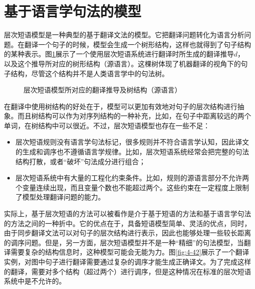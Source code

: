 \sectionnewpage
\section{基于语言学句法的模型}\label{section-4.4}

\parinterval 层次短语模型是一种典型的基于翻译文法的模型。它把翻译问题转化为语言分析问题。在翻译一个句子的时候，模型会生成一个树形结构，这样也就得到了句子结构的某种表示。图\ref{fig:4-41}展示了一个使用层次短语系统进行翻译时所生成的翻译推导$d$，以及这个推导所对应的树形结构（源语言）。这棵树体现了机器翻译的视角下的句子结构，尽管这个结构并不是人类语言学中的句法树。

\begin{figure}[htp]
\centering

\setlength{\belowcaptionskip}{-0.5em}
\caption{层次短语模型所对应的翻译推导及树结构（源语言）}
\label{fig:4-41}
\end{figure}

\parinterval 在翻译中使用树结构的好处在于，模型可以更加有效地对句子的层次结构进行抽象。而且树结构可以作为对序列结构的一种补充，比如，在句子中距离较远的两个单词，在树结构中可以很近。不过，层次短语模型也存在一些不足：

\begin{itemize}
\vspace{0.5em}
\item 层次短语规则没有语言学句法标记，很多规则并不符合语言学认知，因此译文的生成和调序也不遵循语言学规律。比如，层次短语系统经常会把完整的句法结构打散，或者``破坏''句法成分进行组合；
\vspace{0.5em}
\item 层次短语系统中有大量的工程化约束条件。比如，规则的源语言部分不允许两个变量连续出现，而且变量个数也不能超过两个。这些约束在一定程度上限制了模型处理翻译问题的能力。
\vspace{0.5em}
\end{itemize}

\parinterval 实际上，基于层次短语的方法可以被看作是介于基于短语的方法和基于语言学句法的方法之间的一种折中。它的优点在于，具备短语模型简单、灵活的优点，同时，由于同步翻译文法可以对句子的层次结构进行表示，因此也能够处理一些较长距离的调序问题。但是，另一方面，层次短语模型并不是一种``精细''的句法模型，当翻译需要复杂的结构信息时，这种模型可能会无能为力。图\ref{fig:4-42}展示了一个翻译实例，对图中句子进行翻译需要通过复杂的调序才能生成正确译文。为了完成这样的翻译，需要对多个结构（超过两个）进行调序，但是这种情况在标准的层次短语系统中是不允许的。

